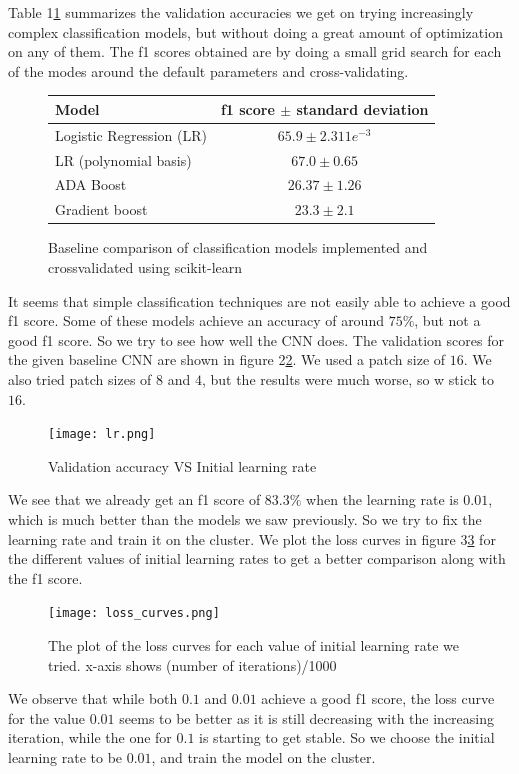 \documentclass[10pt,conference,compsocconf]{IEEEtran}
\begin{document}
Table 1\ref{baseline} summarizes the validation accuracies we get on trying increasingly complex classification models, but without doing a great amount of optimization on any of them. The f1 scores obtained are by doing a small grid search for each of the modes around the default parameters and cross-validating. 
\begin{figure}[h!]\label{baseline}
\center
\begin{tabular}{ l | c  }
  Model & f1 score $\pm$ standard deviation  \\
  \hline
  Logistic Regression (LR) & $65.9 \pm 2.311e^{-3}$  \\
  LR (polynomial basis) & $67.0 \pm 0.65$  \\
  ADA Boost & $26.37 \pm 1.26$ \\
  Gradient boost & $23.3 \pm 2.1$
\end{tabular}
\caption{Baseline comparison of classification models implemented and crossvalidated using scikit-learn}
\end{figure}
It seems that simple classification techniques are not easily able to achieve a good f1 score. Some of these models achieve an accuracy of around $75\%$, but not a good f1 score. So we try to see how well the CNN does. The validation scores for the given baseline CNN are shown in figure 2\ref{lr}. We used a patch size of $16$. We also tried patch sizes of $8$ and $4$, but the results were much worse, so w stick to $16$.
\begin{figure}\label{lr}
 \center
 \texttt{[image: lr.png]}
 \caption{Validation accuracy VS Initial learning rate}
\end{figure}
We see that we already get an f1 score of $83.3\%$ when the learning rate is $0.01$, which is much better than the models we saw previously. So we try to fix the learning rate and train it on the cluster. We plot the loss curves in figure 3\ref{loss} for the different values of initial learning rates to get a better comparison along with the f1 score.  
\begin{figure}\label{loss}
 \center
 \texttt{[image: loss\_curves.png]}
 \caption{The plot of the loss curves for each value of initial learning rate we tried. x-axis shows (number of iterations)/1000}
\end{figure}
We observe that while both $0.1$ and $0.01$ achieve a good f1 score, the loss curve for the value $0.01$ seems to be better as it is still decreasing with the increasing iteration, while the one for $0.1$ is starting to get stable. So we choose the initial learning rate to be $0.01$, and train the model on the cluster.
\end{document}
